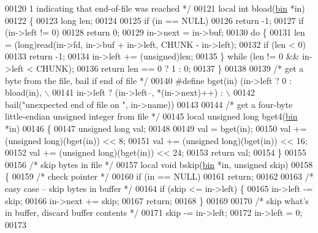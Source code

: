 \begin{DoxyCode}
{00120 \textcolor{comment}{   1 indicating that end-of-file was reached */}
00121 local \textcolor{keywordtype}{int} bload(\hyperlink{structbin}{bin} *in)
00122 \{
00123     \textcolor{keywordtype}{long} len;
00124 
00125     \textcolor{keywordflow}{if} (in == NULL)
00126         \textcolor{keywordflow}{return} -1;
00127     \textcolor{keywordflow}{if} (in->left != 0)
00128         \textcolor{keywordflow}{return} 0;
00129     in->next = in->buf;
00130     \textcolor{keywordflow}{do} \{
00131         len = (long)read(in->fd, in->buf + in->left, CHUNK - in->left);
00132         \textcolor{keywordflow}{if} (len < 0)
00133             \textcolor{keywordflow}{return} -1;
00134         in->left += (unsigned)len;
00135     \} \textcolor{keywordflow}{while} (len != 0 && in->left < CHUNK);
00136     \textcolor{keywordflow}{return} len == 0 ? 1 : 0;
00137 \}
00138 
00139 \textcolor{comment}{/* get a byte from the file, bail if end of file */}
00140 \textcolor{preprocessor}{#define bget(in) (in->left ? 0 : bload(in), \(\backslash\)}
00141 \textcolor{preprocessor}{                  in->left ? (in->left--, *(in->next)++) : \(\backslash\)}
00142 \textcolor{preprocessor}{                    bail("unexpected end of file on ", in->name))}
00143 
00144 \textcolor{comment}{/* get a four-byte little-endian unsigned integer from file */}
00145 local \textcolor{keywordtype}{unsigned} \textcolor{keywordtype}{long} bget4(\hyperlink{structbin}{bin} *in)
00146 \{
00147     \textcolor{keywordtype}{unsigned} \textcolor{keywordtype}{long} val;
00148 
00149     val = bget(in);
00150     val += (\textcolor{keywordtype}{unsigned} long)(bget(in)) << 8;
00151     val += (\textcolor{keywordtype}{unsigned} long)(bget(in)) << 16;
00152     val += (\textcolor{keywordtype}{unsigned} long)(bget(in)) << 24;
00153     \textcolor{keywordflow}{return} val;
00154 \}
00155 
00156 \textcolor{comment}{/* skip bytes in file */}
00157 local \textcolor{keywordtype}{void} bskip(\hyperlink{structbin}{bin} *in, \textcolor{keywordtype}{unsigned} skip)
00158 \{
00159     \textcolor{comment}{/* check pointer */}
00160     \textcolor{keywordflow}{if} (in == NULL)
00161         \textcolor{keywordflow}{return};
00162 
00163     \textcolor{comment}{/* easy case -- skip bytes in buffer */}
00164     \textcolor{keywordflow}{if} (skip <= in->left) \{
00165         in->left -= skip;
00166         in->next += skip;
00167         \textcolor{keywordflow}{return};
00168     \}
00169 
00170     \textcolor{comment}{/* skip what's in buffer, discard buffer contents */}
00171     skip -= in->left;
00172     in->left = 0;
00173 
}
\end{DoxyCode}

